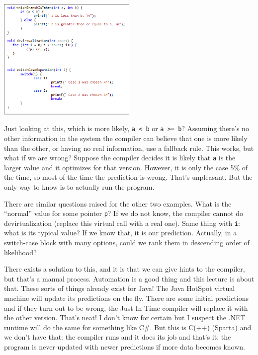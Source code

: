 \documentclass[a4paper]{report}
\begin{document}
\begin{center}
	\includegraphics[width=0.5\textwidth]{images/4621codesnippet.png}
\end{center}

Just looking at this, which is more likely, \texttt{a < b} or \texttt{a >= b}? Assuming there's no other information in the system the compiler can believe that one is more likely than the other, or having no real information, use a fallback rule. This works, but what if we are wrong? Suppose the compiler decides it is likely that \texttt{a} is the larger value and it optimizes for that version. However, it is only the case 5\% of the time, so most of the time the prediction is wrong. That's unpleasant. But the only way to know is to actually run the program.

There are similar questions raised for the other two examples. What is the ``normal'' value for some pointer \texttt{p}? If we do not know, the compiler cannot do devirtualization (replace this virtual call with a real one). Same thing with \texttt{i}: what is its typical value? If we know that, it is our prediction. Actually, in a switch-case block with many options, could we rank them in descending order of likelihood?

There exists a solution to this, and it is that we can give hints to the compiler, but that's a manual process. Automation is a good thing and this lecture is about that. These sorts of things already exist for Java! The Java HotSpot virtual machine will update its predictions on the fly. There are some initial predictions and if they turn out to be wrong, the Just In Time compiler will replace it with the other version. That's neat! I don't know for certain but I suspect the .NET runtime will do the same for something like C\#. But this is C(++) (Sparta) and we don't have that: the compiler runs and it does its job and that's it; the program is never updated with newer predictions if more data becomes known.
\end{document}

